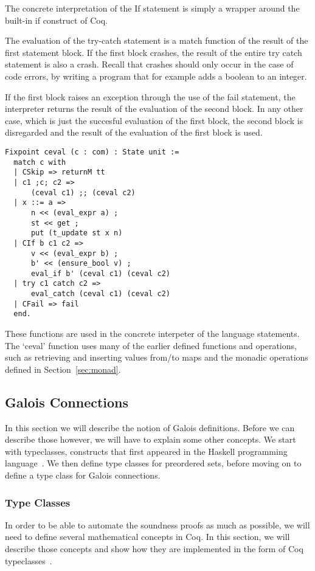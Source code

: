The concrete interpretation of the If statement is simply a wrapper around the
built-in if construct of Coq. 

The evaluation of the try-catch statement is a
match function of the result of the first statement block. If the first block
crashes, the result of the entire try catch statement is also a crash. Recall
that crashes should only occur in the case of code errors, by writing
a program that for example adds a boolean to an integer.

If the first block raises an exception through the use of the fail statement,
the interpreter returns the result of the evaluation of the second block. In
any other case, which is just the succesful evaluation of the first block, the
second block is disregarded and the result of the evaluation of the first block
is used.

\begin{verbatim}
Fixpoint ceval (c : com) : State unit :=
  match c with
  | CSkip => returnM tt
  | c1 ;c; c2 => 
      (ceval c1) ;; (ceval c2)
  | x ::= a => 
      n << (eval_expr a) ;
      st << get ;
      put (t_update st x n)
  | CIf b c1 c2 => 
      v << (eval_expr b) ;
      b' << (ensure_bool v) ;
      eval_if b' (ceval c1) (ceval c2)
  | try c1 catch c2 =>
   	  eval_catch (ceval c1) (ceval c2)
  | CFail => fail
  end.
\end{verbatim}

These functions are used in the concrete interpeter of the language statements.
The `ceval' function uses many of the earlier defined functions and operations,
such as retrieving and inserting values from/to maps and the monadic operations
defined in Section~\ref{sec:monad}.

\subsection{Galois Connections}
In this section we will describe the notion of Galois definitions. Before we
can describe those however, we will have to explain some other concepts. We
start with typeclasses, constructs that first appeared in the Haskell
programming language~\cite{wadler1989make}. We then define type classes for
preordered sets, before moving on to define a type class for Galois
connections.

\subsubsection{Type Classes}
In order to be able to automate the soundness proofs as much as possible, we
will need to define several mathematical concepts in Coq. In this section, we
will describe those concepts and show how they are implemented in the form of
Coq typeclasses~\cite{sozeau2008first}. 

